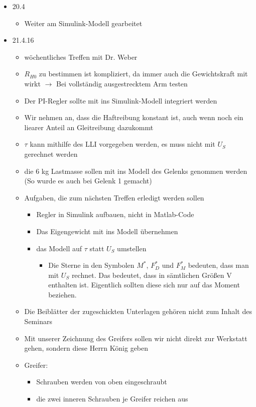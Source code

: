 \documentclass[a4paper,12pt]{article}
\begin{document}
\begin{itemize}
	\item 20.4
	\begin{itemize}
		\item Weiter am Simulink-Modell gearbeitet
	\end{itemize}
	\item 21.4.16
	\begin{itemize}
		\item wöchentliches Treffen mit Dr. Weber
		\item $R_{H0}$ zu bestimmen ist kompliziert, da immer auch die Gewichtskraft mit wirkt $\rightarrow$ Bei vollständig ausgestrecktem Arm testen
		\item Der PI-Regler sollte mit ins Simulink-Modell integriert werden
		\item Wir nehmen an, dass die Haftreibung konstant ist, auch wenn noch ein liearer Anteil an Gleitreibung dazukommt
		\item $\tau$ kann mithilfe des LLI vorgegeben werden, es muss nicht mit $U_S$ gerechnet werden
		\item die 6 kg Lastmasse sollen mit ins Modell des Gelenks genommen werden (So wurde es auch bei Gelenk 1 gemacht)
		\item Aufgaben, die zum nächsten Treffen erledigt werden sollen
			\begin{itemize}
				\item Regler in Simulink aufbauen, nicht in Matlab-Code
				\item Das Eigengewicht mit ins Modell übernehmen
				\item das Modell auf $\tau$ statt $U_S$ umstellen
				\begin{itemize}
					\item Die Sterne in den Symbolen $M^*$, $F_D^*$ und $F_M^*$ bedeuten, dass man mit $U_S$ rechnet. Das bedeutet, dass in sämtlichen Größen V enthalten ist. Eigentlich sollten diese sich nur auf das Moment beziehen.
				\end{itemize}
			\end{itemize}
		\item Die Beiblätter der zugeschickten Unterlagen gehören nicht zum Inhalt des Seminars
		\item Mit unserer Zeichnung des Greifers sollen wir nicht direkt zur Werkstatt gehen, sondern diese Herrn König geben
		\item Greifer:
		\begin{itemize}
			\item Schrauben werden von oben eingeschraubt
			\item die zwei inneren Schrauben je Greifer reichen aus

\end{itemize}
\end{itemize}
\end{itemize}
\end{document}
